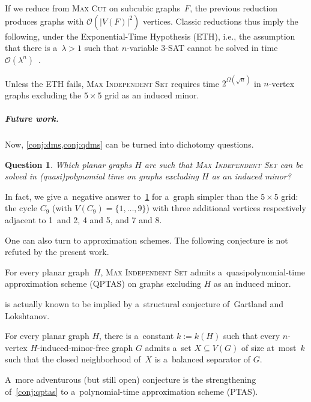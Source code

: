 \documentclass[a4paper,UKenglish,cleveref,autoref]{lipics-v2021}
\newcommand{\mis}{\textsc{Max Independent Set}\xspace}
\newcommand{\Oh}{\mathcal{O}}
\newtheorem{question}{Question}%
\begin{document}
If we reduce from \textsc{Max Cut} on subcubic graphs~$F$, the previous reduction produces graphs with $\Oh(|V(F)|^2)$ vertices.
Classic reductions thus imply the following, under the Exponential-Time Hypothesis (ETH), i.e., the assumption that there is a~$\lambda > 1$ such that $n$-variable \textsc{3-SAT} cannot be solved in time $\Oh(\lambda^n)$~\cite{Impagliazzo01}. 

\begin{corollary}\label{thm:eth}
Unless the ETH fails, \mis requires time $2^{\Omega(\sqrt{n})}$ in $n$-vertex graphs excluding the $5 \times 5$ grid as an induced minor.
\end{corollary}

\subparagraph*{Future work.}
Now, \cref{conj:dms,conj:qdms} can be turned into dichotomy questions.

\begin{question}\label{q:dichotomy}
  Which planar graphs $H$ are such that \mis can be solved in (quasi)polynomial time on graphs excluding $H$ as an induced minor?
\end{question}

In fact, we give a~negative answer to~\cref{q:dichotomy} for a~graph simpler than the $5 \times 5$ grid: the cycle $C_9$ (with $V(C_9)=\{1, \ldots, 9\}$) with three additional vertices respectively adjacent to 1~and 2, 4 and 5, and 7 and 8.

One can also turn to approximation schemes.
The following conjecture is not refuted by the present work.

\begin{conjecture}\label{conj:qptas}
  For every planar graph~$H$, \mis admits a~quasipolynomial-time approximation scheme (QPTAS) on graphs excluding $H$ as an induced minor.
\end{conjecture}

 is actually known to be implied by a~structural conjecture of~Gartland and Lokshtanov.

\begin{conjecture}\label{conj:struct-gl}
For every planar graph $H$, there is a~constant $k := k(H)$ such that every $n$-vertex $H$-induced-minor-free graph $G$ admits a~set $X \subseteq V(G)$ of size at~most~$k$ such that the closed neighborhood of~$X$ is a~balanced separator of $G$.
\end{conjecture}

A~more adventurous (but still open) conjecture is the strengthening of~\cref{conj:qptas} to a~polynomial-time approximation scheme (PTAS).
\end{document}
